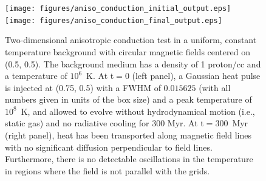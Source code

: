 \begin{figure}
\begin{center}
\texttt{[image: figures/aniso\_conduction\_initial\_output.eps]}
\texttt{[image: figures/aniso\_conduction\_final\_output.eps]}
\caption{Two-dimensional anisotropic conduction test in a uniform,
constant temperature background with circular magnetic fields centered
on (0.5, 0.5).  The background medium has a density of 1 proton/cc and
a temperature of $10^6$~K.  At t$ = 0$ (left panel), a Gaussian heat
pulse is injected at (0.75, 0.5) with a FWHM of $0.015625$ (with all
numbers given in units of the box size) and a peak temperature of
$10^8$~K, and allowed to evolve without hydrodynamical motion (i.e.,
static gas) and no radiative cooling for 300 Myr.  At t$ = 300$~Myr
(right panel), heat has been transported along magnetic field lines
with no significant diffusion perpendicular to field
lines. Furthermore, there is no detectable oscillations in the
temperature in regions where the field is not parallel with the grids.}
\label{fig.conduct}
\end{center}
\end{figure}


